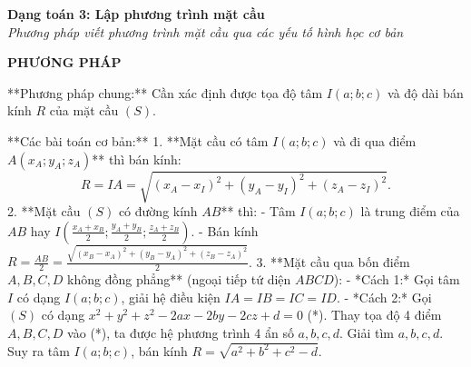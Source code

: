 \documentclass[12pt,a4paper]{article}
\newenvironment{lesson}[2]{
	\noindent\textbf{\Large #1}\\
	\textit{#2}
}{}
\begin{document}
\begin{lesson}{Dạng toán 3: Lập phương trình mặt cầu}{Phương pháp viết phương trình mặt cầu qua các yếu tố hình học cơ bản}

\textbf{PHƯƠNG PHÁP}

**Phương pháp chung:** Cần xác định được tọa độ tâm $I(a;b;c)$ và độ dài bán kính $R$ của mặt cầu $(S)$.

**Các bài toán cơ bản:**
1. **Mặt cầu có tâm $I(a;b;c)$ và đi qua điểm $A(x_A;y_A;z_A)$** thì bán kính:
   $$R = IA = \sqrt{(x_A-x_I)^2 + (y_A-y_I)^2 + (z_A-z_I)^2}.$$
2. **Mặt cầu $(S)$ có đường kính $AB$** thì:
   - Tâm $I(a;b;c)$ là trung điểm của $AB$ hay $I\left(\frac{x_A+x_B}{2}; \frac{y_A+y_B}{2}; \frac{z_A+z_B}{2}\right)$.
   - Bán kính $R = \frac{AB}{2} = \frac{\sqrt{(x_B-x_A)^2 + (y_B-y_A)^2 + (z_B-z_A)^2}}{2}$.
3. **Mặt cầu qua bốn điểm $A, B, C, D$ không đồng phẳng** (ngoại tiếp tứ diện $ABCD$):
   - *Cách 1:* Gọi tâm $I$ có dạng $I(a;b;c)$, giải hệ điều kiện $IA = IB = IC = ID$.
   - *Cách 2:* Gọi $(S)$ có dạng $x^2 + y^2 + z^2 - 2ax - 2by - 2cz + d = 0$ (*). Thay tọa độ 4 điểm $A,B,C,D$ vào (*), ta được hệ phương trình 4 ẩn số $a,b,c,d$. Giải tìm $a,b,c,d$. Suy ra tâm $I(a;b;c)$, bán kính $R = \sqrt{a^2+b^2+c^2-d}$.

\end{lesson}
\end{document}
